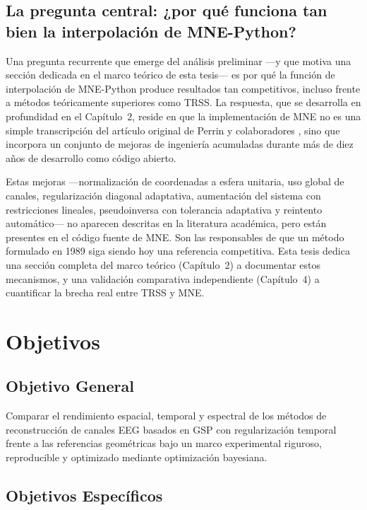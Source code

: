 \subsection{La pregunta central: ¿por qué funciona tan bien la interpolación de MNE-Python?}
\label{sec:why_mne_works}

Una pregunta recurrente que emerge del análisis preliminar —y que motiva una sección dedicada en el marco teórico de esta tesis— es por qué la función de interpolación de MNE-Python produce resultados tan competitivos, incluso frente a métodos teóricamente superiores como TRSS. La respuesta, que se desarrolla en profundidad en el Capítulo~2, reside en que la implementación de MNE no es una simple transcripción del artículo original de Perrin y colaboradores \cite{perrin1989}, sino que incorpora un conjunto de mejoras de ingeniería acumuladas durante más de diez años de desarrollo como código abierto.

Estas mejoras —normalización de coordenadas a esfera unitaria, uso global de canales, regularización diagonal adaptativa, aumentación del sistema con restricciones lineales, pseudoinversa con tolerancia adaptativa y reintento automático— no aparecen descritas en la literatura académica, pero están presentes en el código fuente de MNE. Son las responsables de que un método formulado en 1989 siga siendo hoy una referencia competitiva. Esta tesis dedica una sección completa del marco teórico (Capítulo~2) a documentar estos mecanismos, y una validación comparativa independiente (Capítulo~4) a cuantificar la brecha real entre TRSS y MNE.

\section{Objetivos}

\subsection{Objetivo General}

Comparar el rendimiento espacial, temporal y espectral de los métodos de reconstrucción de canales EEG basados en GSP con regularización temporal frente a las referencias geométricas bajo un marco experimental riguroso, reproducible y optimizado mediante optimización bayesiana. 
\subsection{Objetivos Específicos}

